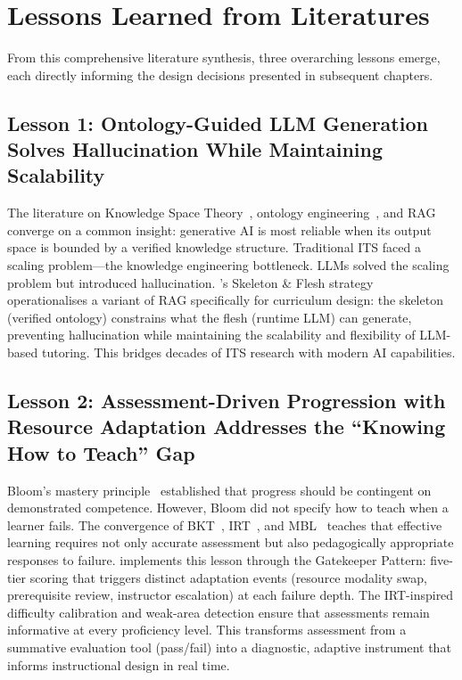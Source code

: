 \section{Lessons Learned from Literatures}
\label{sec:lessons-learned}

From this comprehensive literature synthesis, three overarching lessons emerge, each directly informing the design decisions presented in subsequent chapters.

\subsection*{Lesson 1: Ontology-Guided LLM Generation Solves Hallucination While Maintaining Scalability}

The literature on Knowledge Space Theory~\cite{doignon1985}, ontology engineering~\cite{gruber1993}, and RAG~\cite{lewis2020} converge on a common insight: generative AI is most reliable when its output space is bounded by a verified knowledge structure. Traditional ITS faced a scaling problem---the knowledge engineering bottleneck. LLMs solved the scaling problem but introduced hallucination. \projectname's Skeleton \& Flesh strategy operationalises a variant of RAG specifically for curriculum design: the skeleton (verified ontology) constrains what the flesh (runtime LLM) can generate, preventing hallucination while maintaining the scalability and flexibility of LLM-based tutoring. This bridges decades of ITS research with modern AI capabilities.

\subsection*{Lesson 2: Assessment-Driven Progression with Resource Adaptation Addresses the \enquote{Knowing How to Teach} Gap}

Bloom's mastery principle~\cite{bloom1968} established that progress should be contingent on demonstrated competence. However, Bloom did not specify how to teach when a learner fails. The convergence of BKT~\cite{corbett1994}, IRT~\cite{lord1980}, and MBL~\cite{bloom1968, guskey2007} teaches that effective learning requires not only accurate assessment but also pedagogically appropriate responses to failure. \projectname{} implements this lesson through the Gatekeeper Pattern: five-tier scoring that triggers distinct adaptation events (resource modality swap, prerequisite review, instructor escalation) at each failure depth. The IRT-inspired difficulty calibration and weak-area detection ensure that assessments remain informative at every proficiency level. This transforms assessment from a summative evaluation tool (pass/fail) into a diagnostic, adaptive instrument that informs instructional design in real time.

